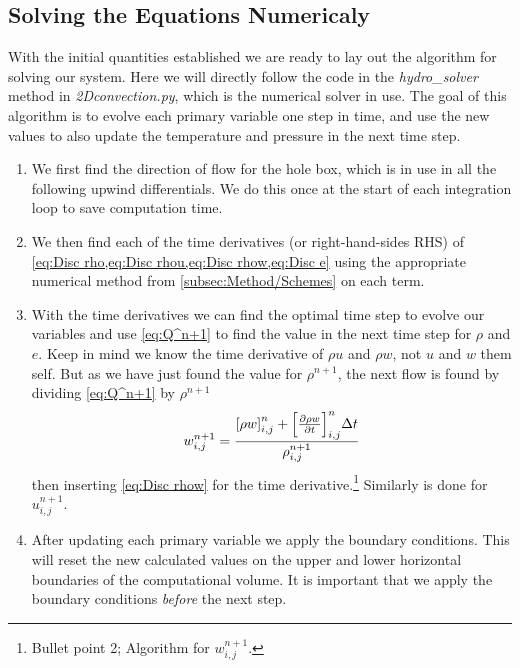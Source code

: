 \documentclass[11pt,a4paper,twocolumn,titlepage]{article}
\newcommand{\disc}[1]    %
{
\ensuremath
\qty[#1]_{i,j}^{n}
}
\begin{document}
\subsection{Solving the Equations Numericaly}\label{subsec:Method/Solving equations}
With the initial quantities established we are ready to lay out the algorithm for solving our system. Here we will directly follow the code in the \textit{hydro\_solver} method in \textit{{2Dconvection.py}}, which is the numerical solver in use. The goal of this algorithm is to evolve each primary variable one step in time, and use the new values to also update the temperature and pressure in the next time step.
\begin{enumerate}
\item We first find the direction of flow for the hole box, which is in use in all the following upwind differentials. We do this once at the start of each integration loop to save computation time.

\item We then find each of the time derivatives (or right-hand-sides RHS) of \cref{eq:Disc rho,eq:Disc rhou,eq:Disc rhow,eq:Disc e} using the appropriate numerical method from \cref{subsec:Method/Schemes} on each term. 

\item With the time derivatives we can find the optimal time step to evolve our variables and use \cref{eq:Q^n+1} to find the value in the next time step for $\rho$ and $e$. Keep in mind we know the time derivative of $\rho u$ and $\rho w$, not $u$ and $w$ them self. But as we have just found the value for $\rho^{n+1}$, the next flow is found by dividing \cref{eq:Q^n+1} by $\rho^{n+1}$
\begin{equation}
w_{i,j}^{n+1} = \frac{\disc{\rho w}+\disc{\pdv{\rho w}{t}}\Delta t}{\rho_{i,j}^{n+1}}
\label{eq:w^n+1}
\end{equation}
then inserting \cref{eq:Disc rhow} for the time derivative.\footnote{Bullet point 2; Algorithm for $w_{i,j}^{n+1}$.} Similarly is done for $u_{i,j}^{n+1}$.

\item After updating each primary variable we apply the boundary conditions. This will reset the new calculated values on the upper and lower horizontal boundaries of the computational volume. It is important that we apply the boundary conditions \textit{before} the next step.


\end{enumerate}
\end{document}
